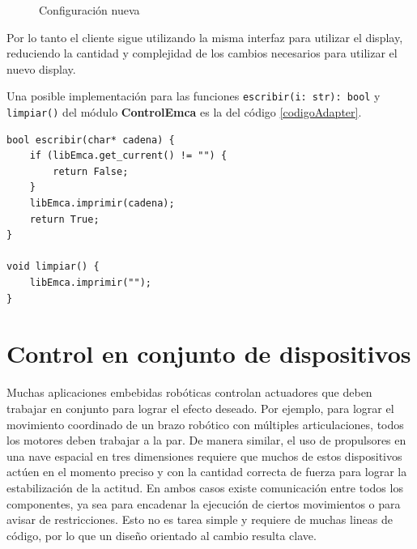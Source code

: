 \begin{figure}[h]
\caption{Configuración nueva}
\label{configNueva}
\begin{center}
\end{center}
\end{figure}

Por lo tanto el cliente sigue utilizando la misma interfaz para utilizar el display, reduciendo la cantidad y complejidad de los cambios necesarios para utilizar el nuevo display.

Una posible implementación para las funciones \verb|escribir(i: str): bool| y \verb|limpiar()| del módulo \textbf{ControlEmca} es la del código \ref{codigoAdapter}.

\begin{lstlisting}[label={codigoAdapter}, caption=Ejemplo implementación módulo Adapter.]
bool escribir(char* cadena) {
    if (libEmca.get_current() != "") {
        return False;
    }
    libEmca.imprimir(cadena);
    return True;
}

void limpiar() {
    libEmca.imprimir("");
}
\end{lstlisting}

\section{Control en conjunto de dispositivos}
Muchas aplicaciones embebidas robóticas controlan \gls{actuadores} que deben trabajar en conjunto para lograr el efecto deseado. Por ejemplo, para lograr el movimiento coordinado de un brazo robótico con múltiples articulaciones, todos los motores deben trabajar a la par. De manera similar, el uso de propulsores en una nave espacial en tres dimensiones requiere que muchos de estos dispositivos actúen en el momento preciso y con la cantidad correcta de fuerza para lograr la estabilización de la actitud. En ambos casos existe comunicación entre todos los componentes, ya sea para encadenar la ejecución de ciertos movimientos o para avisar de restricciones. Esto no es tarea simple y requiere de muchas lineas de código, por lo que un diseño orientado al cambio resulta clave.

